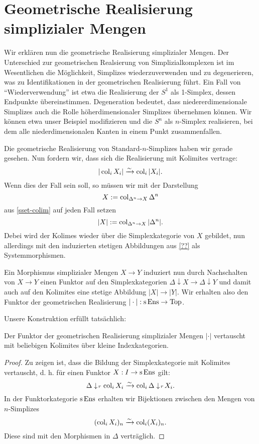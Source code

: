 \section{Geometrische Realisierung simplizialer Mengen}

Wir erklären nun die geometrische Realisierung simplizialer
Mengen. Der Unterschied zur geometrischen Realsierung von
Simplizialkomplexen ist im Wesentlichen die Möglichkeit, Simplizes
wiederzuverwenden und zu degenerieren, was zu Identifikationen in der
geometrischen Realisierung führt. Ein Fall von ``Wiederverwendung''
ist etwa die Realisierung der $S^1$ als 1-Simplex, dessen Endpunkte
übereinstimmen. Degeneration bedeutet, dass niedererdimensionale
Simplizes auch die Rolle höherdimensionaler Simplizes übernehmen
können. Wir können etwa unser Beispiel modifizieren und die $S^n$ als
$n$-Simplex realisieren, bei dem alle niederdimensionalen Kanten in
einem Punkt zusammenfallen.

Die geometrische Realisierung von Standard-$n$-Simplizes haben wir
gerade gesehen. Nun fordern wir, dass sich die Realisierung mit
Kolimites vertrage:
\begin{equation} \label{eq:real-cocont}
|\operatorname{col}_i X_i| \xrightarrow[]{\sim} \operatorname{col}_i |X_i|.
\end{equation}
Wenn dies der Fall sein soll, so müssen wir mit der Darstellung
\[ X := \operatorname{col}_{\Delta^n \to X} \Delta^n \]
aus \ref{sset-colim} auf jeden Fall setzen
\begin{equation} \label{eq:real-colim}
|X| := \operatorname{col}_{\Delta^n \to X} |\Delta^n|.
\end{equation}
Debei wird der Kolimes wieder über die Simplexkategorie von $X$
gebildet, nun allerdings mit den induzierten stetigen Abbildungen aus
\ref{??} als Systemmorphismen.

Ein Morphismus simplizialer Mengen $X \to Y$ induziert nun durch
Nachschalten von $X \to Y$ einen Funktor auf den Simplexkategorien
$\Delta \downarrow X \to \Delta \downarrow Y$ und damit auch auf den
Kolimites eine stetige Abbildung $|X| \to |Y|$. Wir erhalten also den
Funktor der geometrischen Realisierung $| \cdot |: \operatorname{s} \operatorname{Ens} \to \operatorname{Top}$.

Unsere Konstruktion erfüllt tatsächlich:
\begin{prop}
  Der Funktor der geometrischen Realisierung simplizialer Mengen $|
  \cdot|$ vertauscht mit beliebigen Kolimites über kleine
  Indexkategorien.
\end{prop}
\begin{proof}
  Zu zeigen ist, dass die Bildung der Simplexkategorie mit Kolimites
  vertauscht, d. h. für einen Funktor $X: I \to \operatorname{s}\operatorname{Ens}$ gilt:
  \[ \Delta \downarrow \! {\scriptstyle r} \, \operatorname{col}_i X_i \xrightarrow[]{\sim} \operatorname{col}_i \Delta \downarrow \! {\scriptstyle r} \, X_i. \]
  In der Funktorkategorie $\operatorname{s}\operatorname{Ens}$ erhalten wir Bijektionen zwischen
  den Mengen von $n$-Simplizes
  \[ (\operatorname{col}_i X_i)_n \xrightarrow[]{\sim} \operatorname{col}_i (X_i)_n. \]
  Diese sind mit den Morphismen in $\Delta$ verträglich.
\end{proof}

